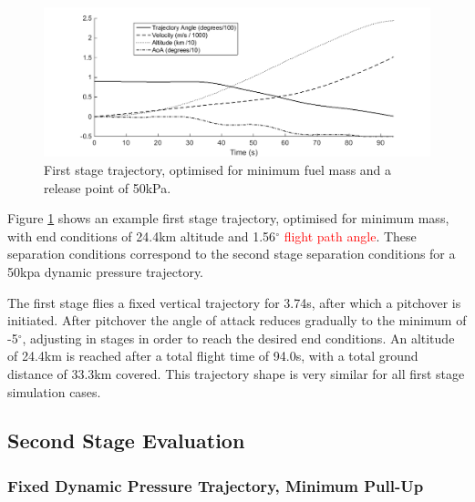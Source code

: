 \documentclass[journal]{new-aiaa}
\begin{document}
\begin{figure}[H]
	\centering
	\includegraphics[width=.9\linewidth]{FirstStage}
	\caption{First stage trajectory, optimised for minimum fuel mass and a release point of 50kPa.}
	\label{fig:FirstStage}
\end{figure}

Figure \ref{fig:FirstStage} shows an example first stage trajectory, optimised for minimum mass, with end conditions of 24.4km altitude and 1.56$^\circ$ \textcolor{red}{flight path angle}. These separation conditions correspond to the second stage separation conditions for a 50kpa dynamic pressure trajectory.

The first stage flies a fixed vertical trajectory for 3.74s, after which a pitchover is initiated. 
After pitchover the angle of attack reduces gradually to the minimum of -5$^\circ$, adjusting in stages in order to reach the desired end conditions. 
An altitude of 24.4km is reached after a total flight time of 94.0s, with a total ground distance of 33.3km covered. 
This trajectory shape is very similar for all first stage simulation cases. 



\subsection{Second Stage Evaluation}
\subsubsection{Fixed Dynamic Pressure Trajectory, Minimum Pull-Up} \label{subsection:Fixed}
\end{document}
